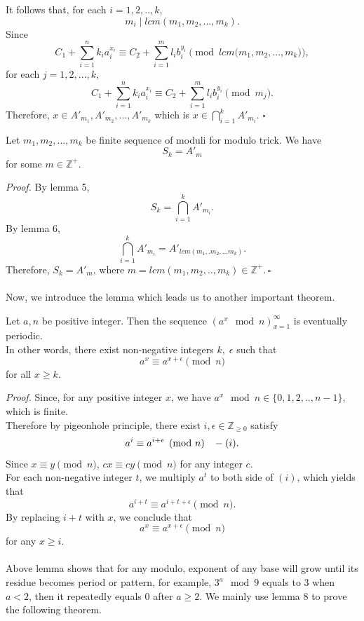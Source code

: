\documentclass[12pt]{article}
\begin{document}
It follows that, for each $i=1,2,..,k$,
\[m_i \; | \; lcm(m_1,m_2,...,m_k).\]
Since
\[    C_1+ \sum_{i=1}^nk_ia_i^{x_i} \equiv C_2 + \sum_{i=1}^ml_ib_i^{y_i}\pmod {lcm(m_1,m_2,...,m_k}),\]
for each $j=1,2,...,k$, 
\[    C_1+ \sum_{i=1}^nk_ia_i^{x_i} \equiv C_2 + \sum_{i=1}^ml_ib_i^{y_i} \pmod {m_j}.\]
Therefore, $x\in A'_{m_1},A'_{m_2},...,A'_{m_k} $ which is $x \in \bigcap_{i=1}^kA'_{m_i}$. $\square$
\begin{lemma} Let $m_1,m_2,...,m_k$ be finite sequence of moduli for modulo trick. We have
\[S_k = A'_m \]
for some $m \in \mathbb{Z}^{+}$.
\end{lemma}
\noindent
\textit{Proof.} By lemma 5, 
\[S_k = \bigcap_{i=1}^k A'_{m_i}.\]
By lemma 6, \[\bigcap_{i=1}^k A'_{m_i} = A'_{lcm(m_1,.m_2,...m_k)} . \]
Therefore, $S_k = A'_m$, where $m=lcm(m_1,m_2,..,m_k)  \in \mathbb{Z}^{+}. \, \square$\\\\
\hspace*{0.5cm}Now, we introduce the lemma which leads us to another important theorem.
\begin{lemma}
    Let $a,n$ be positive integer. Then the sequence $(a^x \mod n )_{x=1}^\infty$ is eventually periodic.\\
    In other words, there exist non-negative integers $k,\; \epsilon$ such that 
    \[a^x \equiv a^{x+\epsilon} \pmod n\]
    for all $x\geq k$.
\end{lemma}
\noindent
\textit{Proof.} Since, for any positive integer $x$, we have $a^x \mod n \in \{0,1,2,..,n-1\}$, which is finite. \\
Therefore by pigeonhole principle, there exist $i,\epsilon \in \mathbb{Z}_{\geq0}$ satisfy
\[a^i \equiv a^{i+\epsilon} \pmod n \hspace{0.3cm}-(i).\]
Since $x \equiv y \pmod n$, $cx \equiv cy \pmod n$ for any integer $c$. \\
For each non-negative integer $t$, we multiply $a^t$ to both side of $(i)$, which yields that 
\[a^{i+t} \equiv a^{i+t+\epsilon} \pmod n.\]
By replacing $i+t$ with $x$, we conclude that
\[a^x \equiv a^{x+\epsilon} \pmod n\]
for any $x \geq i$.\\\\
\hspace*{0.5cm}Above lemma shows that for any modulo, exponent of any base will grow until its residue becomes period or pattern, for example, $3^a \mod 9$ equals to 3 when $a<2$, then it repeatedly equals $0$ after $a\geq2$. We mainly use lemma 8 to prove the following theorem.
\end{document}
